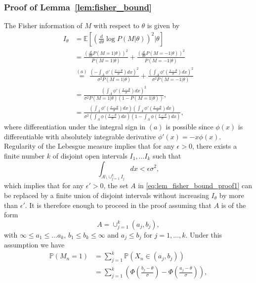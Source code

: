 \documentclass[letterpaper, conference]{IEEEtran}      %
\begin{document}
\subsubsection*{Proof of Lemma~\ref{lem:fisher_bound}}
The Fisher information of $M$ with respect to $\theta$ is given by
\begin{align}
I_\theta & =  \mathbb E \left[ \left( \frac{d}{d\theta} \log P\left( M | \theta \right) \right)^2 |\theta \right] \nonumber \\
& = \frac{ \left(\frac{d}{d\theta} P(M=1|\theta) \right)^2}{P(M=1| \theta)} + \frac{ \left(\frac{d}{d\theta} P(M=-1|\theta) \right)^2} {P(M=-1| \theta)} \nonumber \\
& \overset{(a)}{=} \frac{ \left( - \int_A \phi' \left( \frac{x-\theta}{\sigma} \right)dx \right)^2} {\sigma^2 P(M=1| \theta) } + \frac{ \left( \int_A \phi' \left( \frac{x-\theta}{\sigma} \right)dx \right)^2} { \sigma^2P(M=-1| \theta) } \nonumber \\ 
& = \frac{\left( \int_A \phi'\left( \frac{x-\theta}{\sigma} \right) dx \right)^2 }{  \sigma^2 P(M=1 | \theta) \left(1-P(M=1|\theta) \right)  }, \nonumber \\
& = \frac{\left( \int_A \phi'\left( \frac{x-\theta}{\sigma} \right) dx \right) \left( \int_A \phi'\left( \frac{x-\theta}{\sigma} \right) dx \right)}{  \sigma^2 \left( \int_A \phi \left( \frac{x-\theta}{\sigma} \right) dx \right)  \left(1- \int_A \phi \left( \frac{x-\theta}{\sigma} \right) dx \right) }, \label{eq:lem_fisher_bound_proof1}
\end{align}
where differentiation under the integral sign in $(a)$ is possible since $\phi(x)$ is differentiable with absolutely integrable derivative $\phi'(x) = -x\phi(x)$. Regularity of the Lebesgue measure implies that for any $\epsilon>0$, there exists a finite number $k$ of disjoint open intervals $I_1,\ldots I_k$ such that 
\[
\int_{A\setminus \cup_{j=1}^k I_j }  dx < \epsilon \sigma^2,
\]
which implies that for any $\epsilon' > 0$, the set $A$ in \eqref{eq:lem_fisher_bound_proof1} can be replaced by a finite union of disjoint intervals without increasing $I_\theta$ by more than $\epsilon'$. It is therefore enough to proceed in the proof assuming that $A$ is of the form
\[
A = \cup_{j=1}^k (a_j,b_j),
\]
with $\infty \leq a_1 \leq \ldots a_k$, $b_1 \leq b_k \leq \infty$ and $a_j \leq b_j$ for $j=1,\ldots,k$. Under this assumption we have
\begin{align*}
\mathbb P(M_n=1) & = \sum_{j=1}^k \mathbb P\left(X_n \in (a_j,b_j) \right)  \\
& = \sum_{j=1}^k \left( \Phi \left(\frac{b_j-\theta}{\sigma} \right) -  \Phi \left(\frac{a_j-\theta}{\sigma} \right)  \right),
\end{align*}
\end{document}
